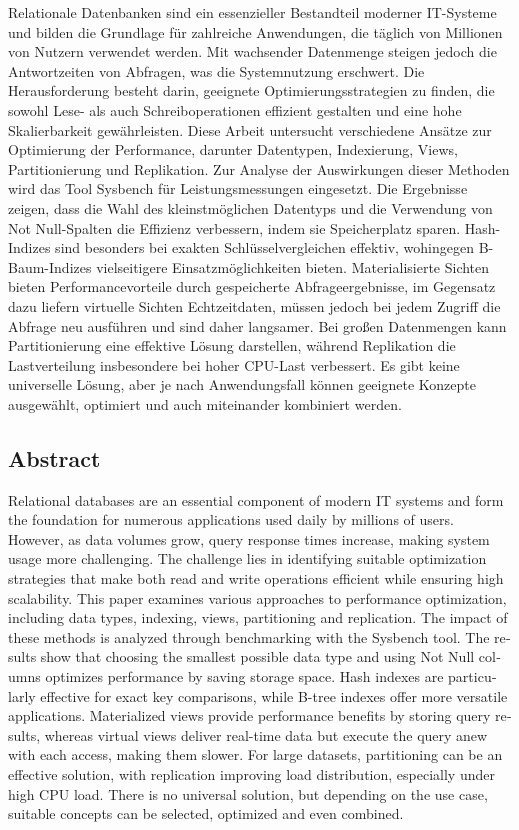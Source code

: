 Relationale Datenbanken sind ein essenzieller Bestandteil moderner IT-Systeme und bilden die Grundlage für zahlreiche Anwendungen, die täglich von Millionen von Nutzern verwendet werden.
Mit wachsender Datenmenge steigen jedoch die Antwortzeiten von Abfragen, was die Systemnutzung erschwert.
Die Herausforderung besteht darin, geeignete Optimierungsstrategien zu finden, die sowohl Lese- als auch Schreiboperationen effizient gestalten und eine hohe Skalierbarkeit gewährleisten.
Diese Arbeit untersucht verschiedene Ansätze zur Optimierung der Performance, darunter Datentypen, Indexierung, Views, Partitionierung und Replikation.
Zur Analyse der Auswirkungen dieser Methoden wird das Tool Sysbench für Leistungsmessungen eingesetzt.
Die Ergebnisse zeigen, dass die Wahl des kleinstmöglichen Datentyps und die Verwendung von Not Null-Spalten die Effizienz verbessern, indem sie Speicherplatz sparen.
Hash-Indizes sind besonders bei exakten Schlüsselvergleichen effektiv, wohingegen B-Baum-Indizes vielseitigere Einsatzmöglichkeiten bieten.
Materialisierte Sichten bieten Performancevorteile durch gespeicherte Abfrageergebnisse, im Gegensatz dazu liefern virtuelle Sichten Echtzeitdaten, müssen jedoch bei jedem Zugriff die Abfrage neu ausführen und sind daher langsamer.
Bei großen Datenmengen kann Partitionierung eine effektive Lösung darstellen, während Replikation die Lastverteilung insbesondere bei hoher CPU-Last verbessert.
Es gibt keine universelle Lösung, aber je nach Anwendungsfall können geeignete Konzepte ausgewählt, optimiert und auch miteinander kombiniert werden.

{
  \begin{otherlanguage}{english}
    \section*{Abstract}
    Relational databases are an essential component of modern IT systems and form the foundation for numerous applications used daily by millions of users.
    However, as data volumes grow, query response times increase, making system usage more challenging.
    The challenge lies in identifying suitable optimization strategies that make both read and write operations efficient while ensuring high scalability.
    This paper examines various approaches to performance optimization, including data types, indexing, views, partitioning and replication.
    The impact of these methods is analyzed through benchmarking with the Sysbench tool.
    The results show that choosing the smallest possible data type and using Not Null columns optimizes performance by saving storage space.
    Hash indexes are particularly effective for exact key comparisons, while B-tree indexes offer more versatile applications.
    Materialized views provide performance benefits by storing query results, whereas virtual views deliver real-time data but execute the query anew with each access, making them slower.
    For large datasets, partitioning can be an effective solution, with replication improving load distribution, especially under high CPU load.
    There is no universal solution, but depending on the use case, suitable concepts can be selected, optimized and even combined.
  \end{otherlanguage}
}
